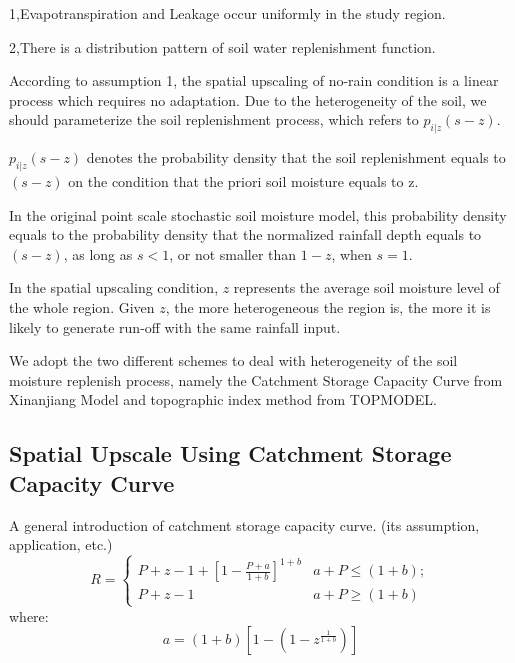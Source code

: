 \documentclass[11pt]{article}
\begin{document}
1,Evapotranspiration and Leakage occur uniformly in the study region.

2,There is a distribution pattern of soil water replenishment function.



According to assumption 1, the spatial upscaling of no-rain condition is a linear process which requires no adaptation.
Due to the heterogeneity of the soil, we should parameterize the soil replenishment process, which refers to $p_{i|z}(s-z)$.

$p_{i|z}(s-z)$ denotes the probability density that the soil replenishment equals to $(s-z)$ on the condition that the priori soil moisture equals to z.
 
In the original point scale stochastic soil moisture model, this probability density equals to the probability density that the normalized rainfall depth equals to $(s-z)$, as long as $s<1$, or not smaller than $1-z$, when $s=1$.  

In the spatial upscaling condition, $z$ represents the average soil moisture level of the whole region. Given $z$, the more heterogeneous the region is, the more it is likely to generate run-off with the same rainfall input. 

We adopt the two different schemes to deal with heterogeneity of the soil moisture replenish process, namely the Catchment Storage Capacity Curve from Xinanjiang Model and topographic index method from TOPMODEL.


\subsection{Spatial Upscale Using Catchment Storage Capacity Curve}

A general introduction of catchment storage capacity curve. (its assumption, application, etc.)
\begin{equation}
R=
 \begin{cases}
 P+z-1+[1-\frac{P+a}{1+b}]^{1+b}&{a+P\leq (1+b)};\\P+z-1 &{a+P\geq (1+b)}
 \end{cases}
\end{equation}
where:
\begin{equation}
a=(1+b)[1-(1-z^{\frac{1}{1+b}})]
\end{equation}
\end{document}
